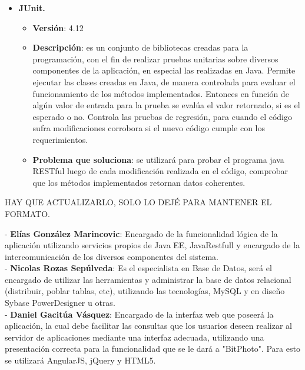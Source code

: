 \documentclass{memoria}
\begin{document}
\begin{itemize}
\item \textbf{JUnit.}
	\begin{itemize}
	\item \textbf{Versión}: 4.12 
	\item \textbf{Descripción}: es un conjunto de bibliotecas creadas para la programación, con el fin de realizar pruebas unitarias sobre diversos componentes de la aplicación, en especial las realizadas en Java. Permite ejecutar las clases creadas en Java, de manera controlada para evaluar el funcionamiento de los métodos implementados. Entonces en función de algún valor de entrada para la prueba se evalúa el valor retornado, si es el esperado o no. Controla las pruebas de regresión, para cuando el código sufra modificaciones corrobora si el nuevo código cumple con los requerimientos.
	\item \textbf{Problema que soluciona}: se utilizará para probar el programa java RESTful luego de cada modificación realizada en el código, comprobar que los métodos implementados retornan datos coherentes.
	\end{itemize}
\end{itemize}



HAY QUE ACTUALIZARLO, SOLO LO DEJÉ PARA MANTENER EL FORMATO.

- \textbf{Elías González Marincovic}: Encargado de la funcionalidad lógica de la aplicación utilizando servicios propios de Java EE, JavaRestfull y encargado de la intercomunicación de los diversos componentes del sistema.\\

- \textbf{Nicolas Rozas Sepúlveda}: Es el especialista en Base de Datos, será el encargado de utilizar las herramientas y administrar la base de datos relacional (distribuir, poblar tablas, etc), utilizando las tecnologías, MySQL y en diseño Sybase PowerDesigner u otras.\\

- \textbf{Daniel Gacitúa Vásquez}: Encargado de la interfaz web que poseerá la aplicación, la cual debe  facilitar las consultas que los usuarios deseen realizar al servidor de aplicaciones mediante una interfaz adecuada, utilizando una presentación correcta para la funcionalidad que se le dará a "BitPhoto". Para esto se utilizará AngularJS, jQuery y HTML5.\\
\end{document}
